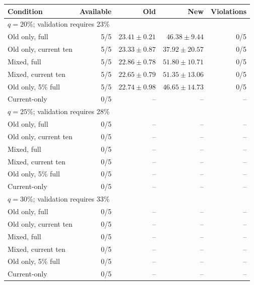 \begin{tabular}{lrrrr}
\toprule
Condition & Available & Old & New & Violations\\
\midrule
\multicolumn{5}{l}{$q=20\%$; validation requires 23\%}\\
Old only, full & 5/5 & $23.41\pm0.21$ & $46.38\pm9.44$ & 0/5\\
Old only, current ten & 5/5 & $23.33\pm0.87$ & $37.92\pm20.57$ & 0/5\\
Mixed, full & 5/5 & $22.86\pm0.78$ & $51.80\pm10.71$ & 0/5\\
Mixed, current ten & 5/5 & $22.65\pm0.79$ & $51.35\pm13.06$ & 0/5\\
Old only, 5\% full & 5/5 & $22.74\pm0.98$ & $46.65\pm14.73$ & 0/5\\
Current-only & 0/5 & -- & -- & --\\
\multicolumn{5}{l}{$q=25\%$; validation requires 28\%}\\
Old only, full & 0/5 & -- & -- & --\\
Old only, current ten & 0/5 & -- & -- & --\\
Mixed, full & 0/5 & -- & -- & --\\
Mixed, current ten & 0/5 & -- & -- & --\\
Old only, 5\% full & 0/5 & -- & -- & --\\
Current-only & 0/5 & -- & -- & --\\
\multicolumn{5}{l}{$q=30\%$; validation requires 33\%}\\
Old only, full & 0/5 & -- & -- & --\\
Old only, current ten & 0/5 & -- & -- & --\\
Mixed, full & 0/5 & -- & -- & --\\
Mixed, current ten & 0/5 & -- & -- & --\\
Old only, 5\% full & 0/5 & -- & -- & --\\
Current-only & 0/5 & -- & -- & --\\
\bottomrule
\end{tabular}
